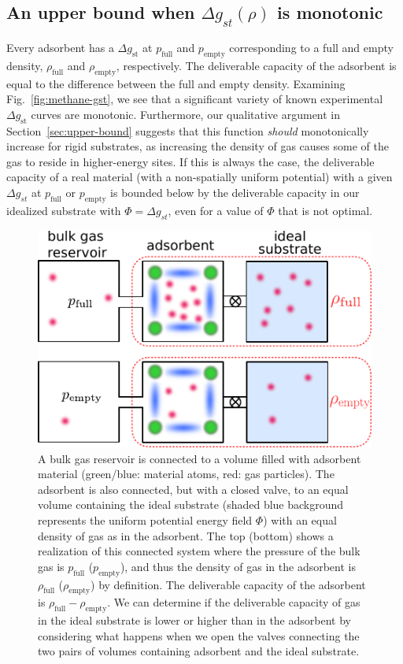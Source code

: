 \documentclass[pre,twocolumn]{revtex4-2}
\newcommand\V{\Phi}
\newcommand\pfull{\ensuremath{p_{\text{full}}}}
\newcommand\pempty{\ensuremath{p_{\text{empty}}}}
\newcommand\rhofull{\ensuremath{\rho_{\text{full}}}}
\newcommand\rhoempty{\ensuremath{\rho_{\text{empty}}}}
\newcommand\gst{\ensuremath{\Delta g_{st}}}
\begin{document}
\subsection{An upper bound when $\gst(\rho)$ is monotonic}\label{sec:monotonic}
Every adsorbent has a $\Delta g_\text{st}$ at $\pfull$ and $\pempty$ corresponding
to a full and empty density, $\rhofull$ and $\rhoempty$, respectively. The deliverable capacity of the adsorbent is equal to
the difference between the full and empty density. Examining
Fig.~\ref{fig:methane-gst}, we see that a significant variety of known
experimental $\Delta g_\text{st}$ curves are monotonic. Furthermore, our
qualitative argument in Section~\ref{sec:upper-bound} suggests that this
function \emph{should} monotonically increase for rigid substrates, as
increasing the density of gas causes some of the gas to reside in higher-energy
sites. If this is always the case, the deliverable capacity of a real material
(with a non-spatially uniform potential) with a given $\gst$ at $\pfull$ or
$\pempty$ is bounded below by the deliverable capacity in our idealized
substrate with $\V=\gst$, even for a value of $\V$ that is not optimal.

\begin{figure}
    \centering
    \includegraphics[width=0.95\columnwidth]{four-cases-pro}
    \caption{A bulk gas reservoir is connected to a volume filled with adsorbent material (green/blue: material atoms, red: gas particles). The adsorbent is also connected, but with a closed valve, to an equal volume containing the ideal substrate (shaded blue background represents the uniform potential energy field $\V$) with an equal density of gas as in the adsorbent. The top (bottom) shows a realization of this connected system where the pressure of the bulk gas is $\pfull$ ($\pempty$), and thus the density of gas in the adsorbent is $\rhofull$ ($\rhoempty$) by definition. The deliverable capacity of the adsorbent is $\rhofull - \rhoempty$. We can determine if the deliverable capacity of gas in the ideal substrate is lower or higher than in the adsorbent by considering what happens when we open the valves connecting the two pairs of volumes containing adsorbent and the ideal substrate.}
    \label{fig:delta-gst-maximum}
\end{figure}
    
\end{document}
